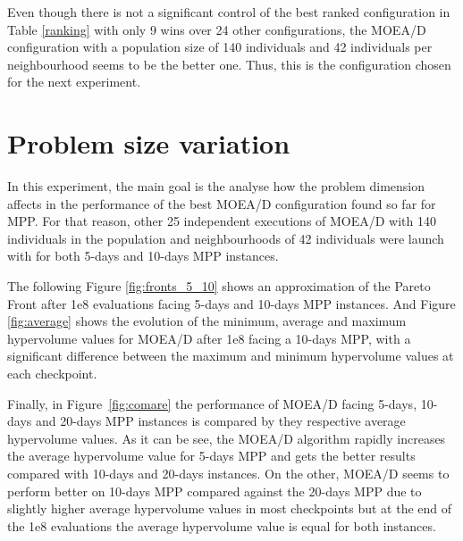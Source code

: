 Even though there is not a significant control of the best ranked configuration in Table \ref{ranking} with only 9 wins over 24 other configurations, the MOEA/D configuration with a population size of 140 individuals and 42 individuals per neighbourhood seems to be the better one. Thus, this is the configuration chosen for the next experiment.


\newpage

\section{Problem size variation}
In this experiment, the main goal is the analyse how the problem dimension affects in the performance of the best MOEA/D configuration found so far for MPP. For that reason, other 25 independent executions of MOEA/D with 140 individuals in the population and neighbourhoods of 42 individuals were launch with for both 5-days and 10-days MPP instances. 



The following Figure \ref{fig:fronts_5_10} shows an approximation of the Pareto Front after 1e8 evaluations facing 5-days and 10-days MPP instances. And Figure \ref{fig:average} shows the evolution of the minimum, average and maximum hypervolume values for MOEA/D after 1e8 facing a 10-days MPP, with a significant difference between the maximum and minimum hypervolume values at each checkpoint.

Finally, in Figure~\ref{fig:comare} the performance of MOEA/D facing 5-days, 10-days and 20-days MPP instances is compared by they respective average hypervolume values. As it can be see, the MOEA/D algorithm rapidly increases the average hypervolume value for 5-days MPP and gets the better results compared with 10-days and 20-days instances. On the other, MOEA/D seems to perform better on 10-days MPP compared against the 20-days MPP due to slightly higher average hypervolume values in most checkpoints but at the end of the 1e8 evaluations the average hypervolume value is equal for both instances.

